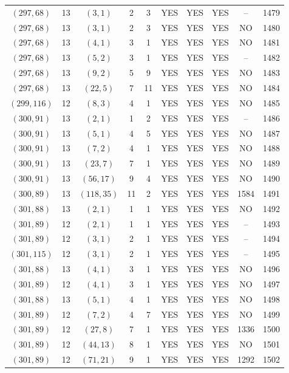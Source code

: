 \begin{longtable}{|c|c|c|c|c|c|c|c|c|c|}
$(297, 68)$ & 13 & $(3, 1)$ & 2 & 3 & YES & YES & YES & -- & 1479\\
$(297, 68)$ & 13 & $(3, 1)$ & 2 & 3 & YES & YES & YES & NO & 1480\\
$(297, 68)$ & 13 & $(4, 1)$ & 3 & 1 & YES & YES & YES & NO & 1481\\
$(297, 68)$ & 13 & $(5, 2)$ & 3 & 1 & YES & YES & YES & -- & 1482\\
$(297, 68)$ & 13 & $(9, 2)$ & 5 & 9 & YES & YES & YES & NO & 1483\\
$(297, 68)$ & 13 & $(22, 5)$ & 7 & 11 & YES & YES & YES & NO & 1484\\
$(299, 116)$ & 12 & $(8, 3)$ & 4 & 1 & YES & YES & YES & NO & 1485\\
$(300, 91)$ & 13 & $(2, 1)$ & 1 & 2 & YES & YES & YES & -- & 1486\\
$(300, 91)$ & 13 & $(5, 1)$ & 4 & 5 & YES & YES & YES & NO & 1487\\
$(300, 91)$ & 13 & $(7, 2)$ & 4 & 1 & YES & YES & YES & NO & 1488\\
$(300, 91)$ & 13 & $(23, 7)$ & 7 & 1 & YES & YES & YES & NO & 1489\\
$(300, 91)$ & 13 & $(56, 17)$ & 9 & 4 & YES & YES & YES & NO & 1490\\
$(300, 89)$ & 13 & $(118, 35)$ & 11 & 2 & YES & YES & YES & 1584 & 1491\\
$(301, 88)$ & 13 & $(2, 1)$ & 1 & 1 & YES & YES & YES & NO & 1492\\
$(301, 89)$ & 12 & $(2, 1)$ & 1 & 1 & YES & YES & YES & -- & 1493\\
$(301, 89)$ & 12 & $(3, 1)$ & 2 & 1 & YES & YES & YES & -- & 1494\\
$(301, 115)$ & 12 & $(3, 1)$ & 2 & 1 & YES & YES & YES & -- & 1495\\
$(301, 88)$ & 13 & $(4, 1)$ & 3 & 1 & YES & YES & YES & NO & 1496\\
$(301, 89)$ & 12 & $(4, 1)$ & 3 & 1 & YES & YES & YES & NO & 1497\\
$(301, 88)$ & 13 & $(5, 1)$ & 4 & 1 & YES & YES & YES & NO & 1498\\
$(301, 89)$ & 12 & $(7, 2)$ & 4 & 7 & YES & YES & YES & NO & 1499\\
$(301, 89)$ & 12 & $(27, 8)$ & 7 & 1 & YES & YES & YES & 1336 & 1500\\
$(301, 89)$ & 12 & $(44, 13)$ & 8 & 1 & YES & YES & YES & NO & 1501\\
$(301, 89)$ & 12 & $(71, 21)$ & 9 & 1 & YES & YES & YES & 1292 & 1502\\

\end{longtable}
